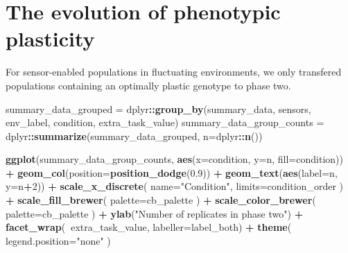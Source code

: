\documentclass[]{book}
\newenvironment{Shaded}{\begin{snugshade}}{\end{snugshade}}
\newcommand{\DataTypeTok}[1]{\textcolor[rgb]{0.13,0.29,0.53}{#1}}
\newcommand{\DecValTok}[1]{\textcolor[rgb]{0.00,0.00,0.81}{#1}}
\newcommand{\FloatTok}[1]{\textcolor[rgb]{0.00,0.00,0.81}{#1}}
\newcommand{\KeywordTok}[1]{\textcolor[rgb]{0.13,0.29,0.53}{\textbf{#1}}}
\newcommand{\NormalTok}[1]{#1}
\newcommand{\OperatorTok}[1]{\textcolor[rgb]{0.81,0.36,0.00}{\textbf{#1}}}
\newcommand{\StringTok}[1]{\textcolor[rgb]{0.31,0.60,0.02}{#1}}
\begin{document}
\hypertarget{the-evolution-of-phenotypic-plasticity-1}{%
\section{The evolution of phenotypic plasticity}\label{the-evolution-of-phenotypic-plasticity-1}}

For sensor-enabled populations in fluctuating environments, we only transfered populations containing an optimally plastic genotype to phase two.

\begin{Shaded}
\begin{Highlighting}[]
\NormalTok{summary_data_grouped =}\StringTok{ }\NormalTok{dplyr}\OperatorTok{::}\KeywordTok{group_by}\NormalTok{(summary_data, sensors, env_label, condition, extra_task_value)}
\NormalTok{summary_data_group_counts =}\StringTok{ }\NormalTok{dplyr}\OperatorTok{::}\KeywordTok{summarize}\NormalTok{(summary_data_grouped, }\DataTypeTok{n=}\NormalTok{dplyr}\OperatorTok{::}\KeywordTok{n}\NormalTok{())}

\KeywordTok{ggplot}\NormalTok{(summary_data_group_counts, }\KeywordTok{aes}\NormalTok{(}\DataTypeTok{x=}\NormalTok{condition, }\DataTypeTok{y=}\NormalTok{n, }\DataTypeTok{fill=}\NormalTok{condition)) }\OperatorTok{+}
\StringTok{  }\KeywordTok{geom_col}\NormalTok{(}\DataTypeTok{position=}\KeywordTok{position_dodge}\NormalTok{(}\FloatTok{0.9}\NormalTok{)) }\OperatorTok{+}
\StringTok{  }\KeywordTok{geom_text}\NormalTok{(}\KeywordTok{aes}\NormalTok{(}\DataTypeTok{label=}\NormalTok{n, }\DataTypeTok{y=}\NormalTok{n}\OperatorTok{+}\DecValTok{2}\NormalTok{)) }\OperatorTok{+}
\StringTok{  }\KeywordTok{scale_x_discrete}\NormalTok{(}
    \DataTypeTok{name=}\StringTok{"Condition"}\NormalTok{,}
    \DataTypeTok{limits=}\NormalTok{condition_order}
\NormalTok{  ) }\OperatorTok{+}
\StringTok{  }\KeywordTok{scale_fill_brewer}\NormalTok{(}
    \DataTypeTok{palette=}\NormalTok{cb_palette}
\NormalTok{  ) }\OperatorTok{+}
\StringTok{  }\KeywordTok{scale_color_brewer}\NormalTok{(}
    \DataTypeTok{palette=}\NormalTok{cb_palette}
\NormalTok{  ) }\OperatorTok{+}
\StringTok{  }\KeywordTok{ylab}\NormalTok{(}\StringTok{"Number of replicates in phase two"}\NormalTok{) }\OperatorTok{+}
\StringTok{  }\KeywordTok{facet_wrap}\NormalTok{(}\OperatorTok{~}\NormalTok{extra_task_value, }\DataTypeTok{labeller=}\NormalTok{label_both) }\OperatorTok{+}
\StringTok{  }\KeywordTok{theme}\NormalTok{(}
    \DataTypeTok{legend.position=}\StringTok{"none"}
\NormalTok{  )}
\end{Highlighting}
\end{Shaded}
\end{document}
